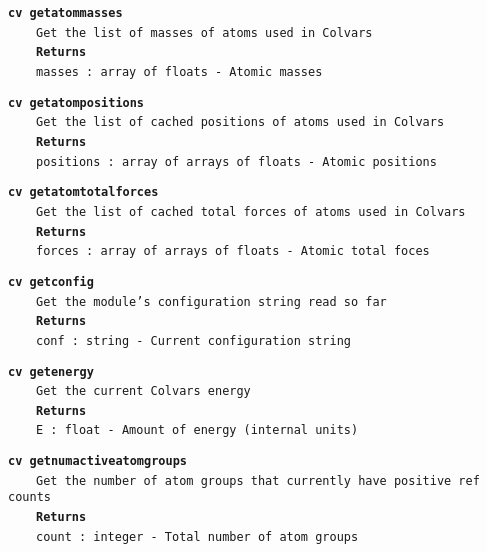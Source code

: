 \begin{mdexampleinput}{}
\texttt{\textbf{cv getatommasses}}
\\
\-~~~~\texttt{Get the list of masses of atoms used in Colvars}
\\
\-~~~~\texttt{\textbf{Returns}}
\\
\-~~~~\texttt{masses : array of floats - Atomic masses}
\end{mdexampleinput}
\begin{mdexampleinput}{}
\texttt{\textbf{cv getatompositions}}
\\
\-~~~~\texttt{Get the list of cached positions of atoms used in Colvars}
\\
\-~~~~\texttt{\textbf{Returns}}
\\
\-~~~~\texttt{positions : array of arrays of floats - Atomic positions}
\end{mdexampleinput}
\begin{mdexampleinput}{}
\texttt{\textbf{cv getatomtotalforces}}
\\
\-~~~~\texttt{Get the list of cached total forces of atoms used in Colvars}
\\
\-~~~~\texttt{\textbf{Returns}}
\\
\-~~~~\texttt{forces : array of arrays of floats - Atomic total foces}
\end{mdexampleinput}
\begin{mdexampleinput}{}
\texttt{\textbf{cv getconfig}}
\\
\-~~~~\texttt{Get the module's configuration string read so far}
\\
\-~~~~\texttt{\textbf{Returns}}
\\
\-~~~~\texttt{conf : string - Current configuration string}
\end{mdexampleinput}
\begin{mdexampleinput}{}
\texttt{\textbf{cv getenergy}}
\\
\-~~~~\texttt{Get the current Colvars energy}
\\
\-~~~~\texttt{\textbf{Returns}}
\\
\-~~~~\texttt{E : float - Amount of energy (internal units)}
\end{mdexampleinput}
\begin{mdexampleinput}{}
\texttt{\textbf{cv getnumactiveatomgroups}}
\\
\-~~~~\texttt{Get the number of atom groups that currently have positive ref counts}
\\
\-~~~~\texttt{\textbf{Returns}}
\\
\-~~~~\texttt{count : integer - Total number of atom groups}
\end{mdexampleinput}
